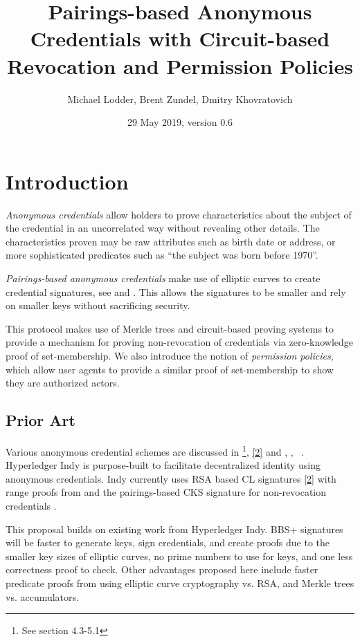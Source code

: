 \documentclass[a4paper]{article}
\title{Pairings-based Anonymous Credentials with Circuit-based Revocation and Permission Policies}
\author{Michael Lodder, Brent Zundel, Dmitry Khovratovich}
\date{29 May 2019, version 0.6}
\begin{document}
\maketitle
{}

\section{Introduction}
\emph{Anonymous credentials} allow holders to prove characteristics about the subject of the credential in an uncorrelated way without revealing other details. The characteristics proven may be raw attributes such as birth date or address, or more sophisticated predicates such as ``the subject was born before 1970''. 

\emph{Pairings-based anonymous credentials} make use of elliptic curves to create credential signatures, see \cite{CamenischDL16} and \cite{SBBD}. This allows the signatures to be smaller and rely on smaller keys without sacrificing security.

This protocol makes use of Merkle trees and circuit-based proving systems to provide a mechanism for proving non-revocation of credentials via zero-knowledge proof of set-membership. We also introduce the notion of \emph{permission policies}, which allow user agents to provide a similar proof of set-membership to show they are authorized actors.

\subsection{Prior Art}
Various anonymous credential schemes are discussed in \cite{CamenischDL16}\footnote{See section 4.3-5.1}, \href{https://domino.research.ibm.com/library/cyberdig.nsf/1e4115aea78b6e7c85256b360066f0d4/eeb54ff3b91c1d648525759b004fbbb1?OpenDocument}{[2]} and \cite{SBBD}, \cite{CamenischKS09}, ~\cite{CamenischL02}. Hyperledger Indy is purpose-built to facilitate decentralized identity using anonymous credentials. Indy currently uses RSA based CL signatures  \href{https://domino.research.ibm.com/library/cyberdig.nsf/1e4115aea78b6e7c85256b360066f0d4/eeb54ff3b91c1d648525759b004fbbb1?OpenDocument}{[2]} with range proofs from \cite{CamChaShe08} and the pairings-based CKS signature for non-revocation credentials \cite{CamenischKS09}.

This proposal builds on existing work from Hyperledger Indy. BBS+ signatures will be faster to generate keys, sign credentials, and create proofs due to the smaller key sizes of elliptic curves, no prime numbers to use for keys, and one less correctness proof to check. Other advantages proposed here include faster predicate proofs from using elliptic curve cryptography vs. RSA, and Merkle trees vs. accumulators. 
\end{document}
